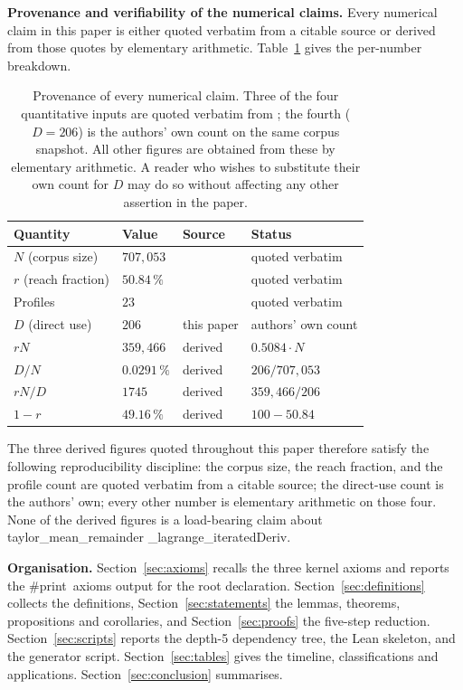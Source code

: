 \documentclass[11pt,reqno]{amsart}
\begin{document}
\smallskip\noindent\textbf{Provenance and verifiability of the numerical
claims.} Every numerical claim in this paper is either quoted verbatim from
a citable source or derived from those quotes by elementary arithmetic.
Table~\ref{tab:provenance} gives the per-number breakdown.

\begin{table}[]
\centering
{} 
\begin{tabular}{|l|l|l|l|}
\hline
\textbf{Quantity} & \textbf{Value} & \textbf{Source} & \textbf{Status} \\ 
\hline
$N$ (corpus size) & $707{,}053$ & \cite{close2026axiom} & quoted verbatim \\ 
$r$ (reach fraction) & $50.84\,\%$ & \cite{close2026axiom} & quoted verbatim
\\ 
Profiles & $23$ & \cite{close2026axiom} & quoted verbatim \\ 
$D$ (direct use) & $206$ & this paper & authors' own count \\ 
$rN$ & $359{,}466$ & derived & $0.5084 \cdot N$ \\ 
$D/N$ & $0.0291\,\%$ & derived & $206 / 707{,}053$ \\ 
$rN/D$ & $1745$ & derived & $359{,}466 / 206$ \\ 
$1-r$ & $49.16\,\%$ & derived & $100 - 50.84$ \\ \hline
\end{tabular}
\medskip
\caption{ Provenance of every numerical claim. Three of the
four quantitative inputs are quoted verbatim from \protect\cite%
{close2026axiom}; the fourth ($D=206$) is the authors' own count on the same
corpus snapshot. All other figures are obtained from these by elementary
arithmetic. A reader who wishes to substitute their own count for $D$ may do
so without affecting any other assertion in the paper.}
\label{tab:provenance}
\end{table}

\noindent The three derived figures quoted throughout this paper therefore
satisfy the following reproducibility discipline: the corpus size, the reach
fraction, and the profile count are quoted verbatim from a citable source;
the direct-use count is the authors' own; every other number is elementary
arithmetic on those four. None of the derived figures is a load-bearing
claim about \textsf{taylor\allowbreak\_mean\allowbreak\_remainder\allowbreak%
\_lagrange\allowbreak \_iterated\allowbreak Deriv}.

\smallskip\noindent\textbf{Organisation.} Section~\ref{sec:axioms} recalls
the three kernel axioms and reports the \textsf{\#print\ axioms} output for
the root declaration. Section~\ref{sec:definitions} collects the
definitions, Section~\ref{sec:statements} the lemmas, theorems, propositions
and corollaries, and Section~\ref{sec:proofs} the five-step reduction.
Section~\ref{sec:scripts} reports the depth-5 dependency tree, the Lean
skeleton, and the generator script. Section~\ref{sec:tables} gives the
timeline, classifications and applications. Section~\ref{sec:conclusion}
summarises.
\end{document}
